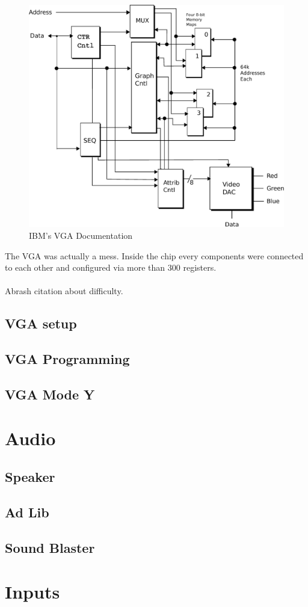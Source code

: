 \documentclass[book.tex]{subfiles}
\begin{document}
\begin{figure}[H]
\centering
\includegraphics[scale=0.4]{imgs/ibm_vga.eps}
%
\caption{IBM's VGA Documentation}
\label{fig:ibm_vga}
\end{figure}

The VGA was actually a mess. Inside the chip every components were connected to each other and configured via more than 300 registers.\\
\\
Abrash citation about difficulty.
 
 
  \subsection{VGA setup}

  \subsection{VGA Programming}
  \subsection{VGA Mode Y}
\section{Audio}
  \subsection{Speaker}
  \subsection{Ad Lib}
  \subsection{Sound Blaster}

\section{Inputs}
\end{document}
